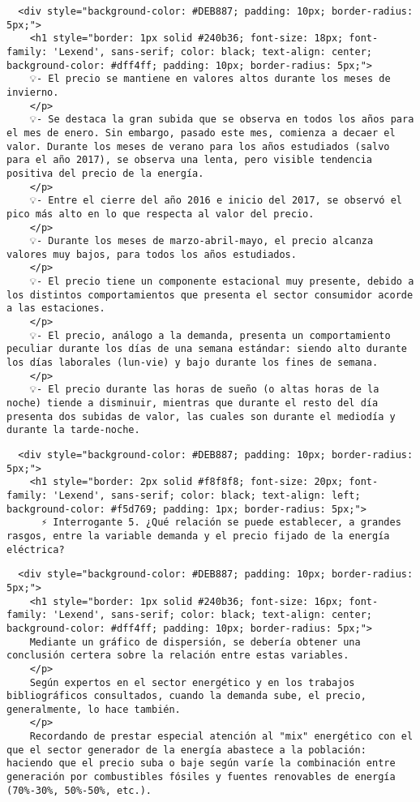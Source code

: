 \documentclass[11pt]{article}
\begin{document}
    
    \begin{verbatim}
  <div style="background-color: #DEB887; padding: 10px; border-radius: 5px;">
    <h1 style="border: 1px solid #240b36; font-size: 18px; font-family: 'Lexend', sans-serif; color: black; text-align: center; background-color: #dff4ff; padding: 10px; border-radius: 5px;">
    💡- El precio se mantiene en valores altos durante los meses de invierno.
    </p>
    💡- Se destaca la gran subida que se observa en todos los años para el mes de enero. Sin embargo, pasado este mes, comienza a decaer el valor. Durante los meses de verano para los años estudiados (salvo para el año 2017), se observa una lenta, pero visible tendencia positiva del precio de la energía.
    </p>
    💡- Entre el cierre del año 2016 e inicio del 2017, se observó el pico más alto en lo que respecta al valor del precio.
    </p>
    💡- Durante los meses de marzo-abril-mayo, el precio alcanza valores muy bajos, para todos los años estudiados.
    </p>
    💡- El precio tiene un componente estacional muy presente, debido a los distintos comportamientos que presenta el sector consumidor acorde a las estaciones.
    </p>
    💡- El precio, análogo a la demanda, presenta un comportamiento peculiar durante los días de una semana estándar: siendo alto durante los días laborales (lun-vie) y bajo durante los fines de semana.
    </p>
    💡- El precio durante las horas de sueño (o altas horas de la noche) tiende a disminuir, mientras que durante el resto del día presenta dos subidas de valor, las cuales son durante el mediodía y durante la tarde-noche.
\end{verbatim}

    \begin{verbatim}
  <div style="background-color: #DEB887; padding: 10px; border-radius: 5px;">
    <h1 style="border: 2px solid #f8f8f8; font-size: 20px; font-family: 'Lexend', sans-serif; color: black; text-align: left; background-color: #f5d769; padding: 1px; border-radius: 5px;">
      ⚡ Interrogante 5. ¿Qué relación se puede establecer, a grandes rasgos, entre la variable demanda y el precio fijado de la energía eléctrica?
\end{verbatim}

    \begin{verbatim}
  <div style="background-color: #DEB887; padding: 10px; border-radius: 5px;">
    <h1 style="border: 1px solid #240b36; font-size: 16px; font-family: 'Lexend', sans-serif; color: black; text-align: center; background-color: #dff4ff; padding: 10px; border-radius: 5px;">
    Mediante un gráfico de dispersión, se debería obtener una conclusión certera sobre la relación entre estas variables.
    </p>
    Según expertos en el sector energético y en los trabajos bibliográficos consultados, cuando la demanda sube, el precio, generalmente, lo hace también.
    </p>
    Recordando de prestar especial atención al "mix" energético con el que el sector generador de la energía abastece a la población: haciendo que el precio suba o baje según varíe la combinación entre generación por combustibles fósiles y fuentes renovables de energía (70%-30%, 50%-50%, etc.).
\end{verbatim}
\end{document}
